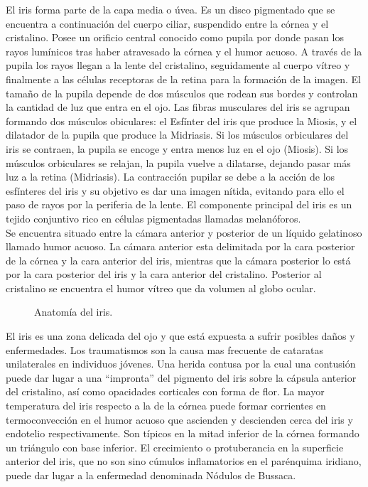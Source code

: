 El iris forma parte de la capa media o úvea. Es un disco pigmentado que se encuentra a continuación del cuerpo ciliar, suspendido entre la córnea y el cristalino. Posee un orificio central conocido como pupila por donde pasan los rayos lumínicos tras haber atravesado la córnea y el humor acuoso. A través de la pupila los rayos llegan a la lente del cristalino, seguidamente al cuerpo vítreo y finalmente a las células receptoras de la retina para la formación de la imagen. El tamaño de la pupila depende de dos músculos que rodean sus bordes y controlan la cantidad de luz que entra en el ojo. Las fibras musculares del iris se agrupan formando dos músculos obiculares: el Esfínter del iris que produce la Miosis, y el dilatador de la pupila que produce la Midriasis. Si los músculos orbiculares del iris se contraen, la pupila se encoge y entra menos luz en el ojo (Miosis). Si los músculos orbiculares se relajan, la pupila vuelve a dilatarse, dejando pasar más luz a la retina (Midriasis).  La contracción pupilar se debe  a la acción de los esfínteres del iris y su objetivo es dar una imagen nítida, evitando para ello el paso de rayos por la periferia de la lente. El componente principal del iris es un tejido conjuntivo rico en células pigmentadas llamadas melanóforos.\\

Se encuentra situado entre la cámara anterior y posterior de un líquido gelatinoso llamado humor acuoso. La cámara anterior esta delimitada por la cara posterior de la córnea y la cara anterior del iris, mientras que la cámara posterior lo está por la cara posterior del iris y la cara anterior del cristalino. Posterior al cristalino se encuentra el humor vítreo que da volumen al globo ocular. \\

\begin{figure}[htbp]
\centering
{}
\caption{Anatomía del iris.} \label{fig:señales}
\end{figure}

El iris es una zona delicada del ojo y que está expuesta a sufrir posibles daños y enfermedades. Los traumatismos son la causa mas frecuente de cataratas unilaterales en individuos jóvenes. Una herida contusa por la cual una contusión puede dar lugar a una “impronta” del pigmento del iris sobre la cápsula anterior del cristalino, así como opacidades corticales con forma de flor. La mayor temperatura del iris respecto a la de la córnea puede formar corrientes en termoconvección en el humor acuoso que ascienden y descienden cerca del iris y endotelio respectivamente. Son típicos en la mitad inferior de la córnea formando un triángulo con base inferior. El crecimiento o protuberancia en la superficie anterior del iris, que no son sino cúmulos inflamatorios en el parénquima iridiano, puede dar lugar a la enfermedad denominada Nódulos de Bussaca. \\

